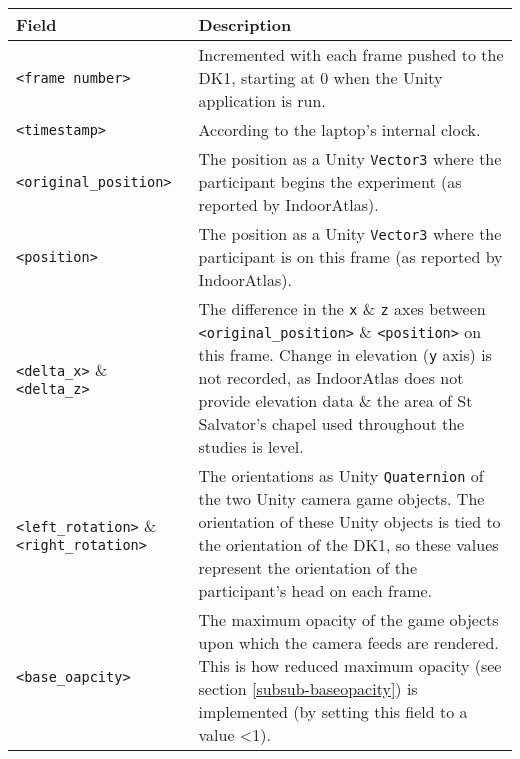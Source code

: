 \begin{center}
\begin{longtable}{| l | p{8cm} |}

\hline

\textbf{Field} & \textbf{Description} \\

\hline

\texttt{<frame number>} & Incremented with each frame pushed to the DK1, starting at 0 when the Unity application is run. \\

\hline

\texttt{<timestamp>} & According to the laptop's internal clock. \\

\hline

\texttt{<original\_position>} & The position as a Unity \texttt{Vector3} where the participant begins the experiment (as reported by IndoorAtlas). \\

\hline

\texttt{<position>} & The position as a Unity \texttt{Vector3} where the participant is on this frame (as reported by IndoorAtlas). \\

\hline

\texttt{<delta\_x>} \& \texttt{<delta\_z>} & The difference in the \texttt{x} \& \texttt{z} axes between \texttt{<original\_position>} \& \texttt{<position>} on this frame. Change in elevation (\texttt{y} axis) is not recorded, as IndoorAtlas does not provide elevation data \& the area of St Salvator's chapel used throughout the studies is level. \\

\hline

\texttt{<left\_rotation>} \& \texttt{<right\_rotation>} & The orientations as Unity \texttt{Quaternion} of the two Unity camera game objects. The orientation of these Unity objects is tied to the orientation of the DK1, so these values represent the orientation of the participant's head on each frame. \\

\hline

\texttt{<base\_oapcity>} & The maximum opacity of the game objects upon which the camera feeds are rendered. This is how reduced maximum opacity (see section \ref{subsub-baseopacity}) is implemented (by setting this field to a value \textless 1). \\


\end{longtable}
\end{center}
